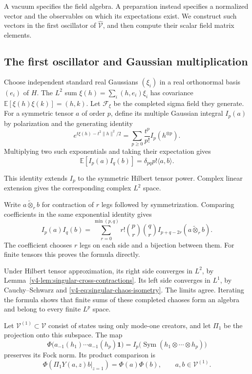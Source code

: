 A vacuum specifies the field algebra. A preparation
instead specifies a normalized vector and the
observables on which its expectations exist.
We construct such vectors in the first oscillator
of \(\widehat{\mathcal V}\), and then compute
their scalar field matrix elements.

\subsection{The first oscillator and Gaussian multiplication}

Choose independent standard real Gaussians
\((\xi_i)\) in a real orthonormal basis \((e_i)\) of \(H\).
The \(L^2\) sum
\(\xi(h)=\sum_i(h,e_i)\xi_i\) has covariance
\(\mathbb E[\xi(h)\xi(k)]=(h,k)\).
Let \(\mathcal F_\xi\) be the completed sigma field
they generate. For a symmetric tensor \(a\) of order
\(p\), define its multiple Gaussian integral \(I_p(a)\)
by polarization and the generating identity
\[
 e^{t\xi(h)-t^2\|h\|^2/2}
       =\sum_{p\geq0}\frac{t^p}{p!}I_p(h^{\otimes p}).
\]
Multiplying two such exponentials and taking their
expectation gives
\begin{equation}\label{v4-eq:singular-chaos-isometry}
 \mathbb E[I_p(a)I_q(b)]
          =\delta_{pq}p!\langle a,b\rangle.
\end{equation}

This identity extends \(I_p\) to the symmetric Hilbert
tensor power. Complex linear extension gives the
corresponding complex \(L^2\) space.

Write \(a\widetilde\otimes_r b\) for contraction of
\(r\) legs followed by symmetrization. Comparing
coefficients in the same exponential identity gives
\begin{equation}\label{v4-eq:singular-chaos-product}
 I_p(a)I_q(b)
   =\sum_{r=0}^{\min(p,q)}
       r!\binom pr\binom qr
           I_{p+q-2r}(a\widetilde\otimes_r b).
\end{equation}
The coefficient chooses \(r\) legs on each side
and a bijection between them.
For finite tensors this proves the formula directly.

Under Hilbert tensor approximation, its right side
converges in \(L^2\), by
Lemma~\ref{v4-lem:singular-cross-contractions}.
Its left side converges in \(L^1\), by
Cauchy--Schwarz and \eqref{v4-eq:singular-chaos-isometry}.
The limits agree. Iterating the formula shows that
finite sums of these completed chaoses form an
algebra and belong to every finite \(L^p\) space.

Let \(\mathcal V^{(1)}\subset\mathcal V\) consist
of states using only mode-one creators, and let
\(\Pi_1\) be the projection onto this subspace.
The map
\[
 \Phi\bigl(a_{-1}(h_1)\cdots a_{-1}(h_p)\mathbf1\bigr)
       =I_p\bigl(\operatorname{Sym}(h_1\otimes\cdots\otimes h_p)\bigr)
\]
preserves its Fock norm. Its product comparison is
\begin{equation}\label{v4-eq:singular-gaussian-projection}
 \Phi\left(\left.\Pi_1Y(a,z)b\right|_{z=1}\right)
                         =\Phi(a)\Phi(b),
 \qquad a,b\in\mathcal V^{(1)}.
\end{equation}

